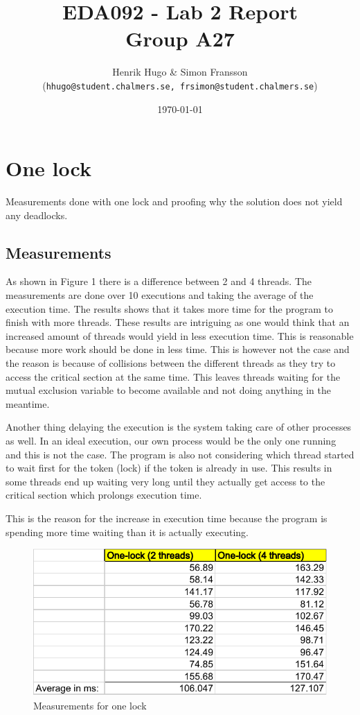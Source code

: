 \documentclass[a4paper,11pt,twoside,fleqn]{article}
\title{	
\normalfont \normalsize 
\huge EDA092 - Lab 2 Report \\ Group A27 \\ %
}
\author{Henrik Hugo \& Simon Fransson \\ (\texttt{hhugo@student.chalmers.se, frsimon@student.chalmers.se})} %
\date{\normalsize\today} %
\begin{document}
\maketitle %
\clearpage

\section{One lock}
Measurements done with one lock and proofing why the solution does not yield any deadlocks.
\subsection{Measurements}
As shown in Figure 1 there is a difference between 2 and 4 threads. The measurements are done over 10 executions and taking the average of the execution time. The results shows that it takes more time for the program to finish with more threads. These results are intriguing as one would think that an increased amount of threads would yield in less execution time. This is reasonable because more work should be done in less time. This is however not the case and the reason is because of collisions between the different threads as they try to access the critical section at the same time. This leaves threads waiting for the mutual exclusion variable to become available and not doing anything in the meantime. 

Another thing delaying the execution is the system taking care of other processes as well. In an ideal execution, our own process would be the only one running and this is not the case. The program is also not considering which thread started to wait first for the token (lock) if the token is already in use. This results in some threads end up waiting very long until they actually get access to the critical section which prolongs execution time.

This is the reason for the increase in execution time because the program is spending more time waiting than it is actually executing.

\begin{figure}[h]
	\caption{Measurements for one lock}
	\centering
		\includegraphics{measurements-for-one-lock}
\end{figure}
\end{document}
